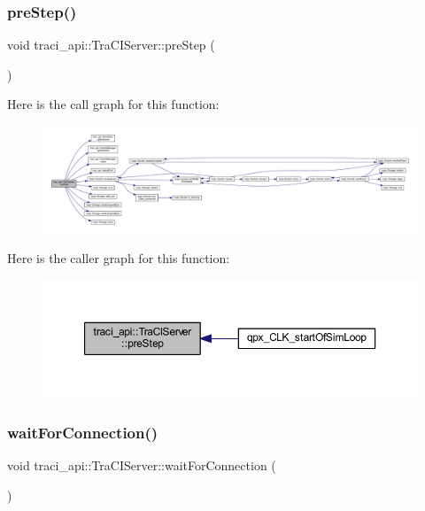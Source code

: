 \subsubsection{\texorpdfstring{pre\+Step()}{preStep()}}
{\footnotesize\ttfamily void traci\+\_\+api\+::\+Tra\+C\+I\+Server\+::pre\+Step (\begin{DoxyParamCaption}{ }\end{DoxyParamCaption})}

Here is the call graph for this function\+:
\nopagebreak
\begin{figure}[H]
\begin{center}
\leavevmode
\includegraphics[width=350pt]{classtraci__api_1_1_tra_c_i_server_a8cd79e7da542e4abccc75d4933331d20_cgraph}
\end{center}
\end{figure}
Here is the caller graph for this function\+:
\nopagebreak
\begin{figure}[H]
\begin{center}
\leavevmode
\includegraphics[width=350pt]{classtraci__api_1_1_tra_c_i_server_a8cd79e7da542e4abccc75d4933331d20_icgraph}
\end{center}
\end{figure}
\mbox{\label{classtraci__api_1_1_tra_c_i_server_ac9cc474ec4ae6277c82cbf80f212852e}} 
\subsubsection{\texorpdfstring{wait\+For\+Connection()}{waitForConnection()}}
{\footnotesize\ttfamily void traci\+\_\+api\+::\+Tra\+C\+I\+Server\+::wait\+For\+Connection (\begin{DoxyParamCaption}{ }\end{DoxyParamCaption})}



